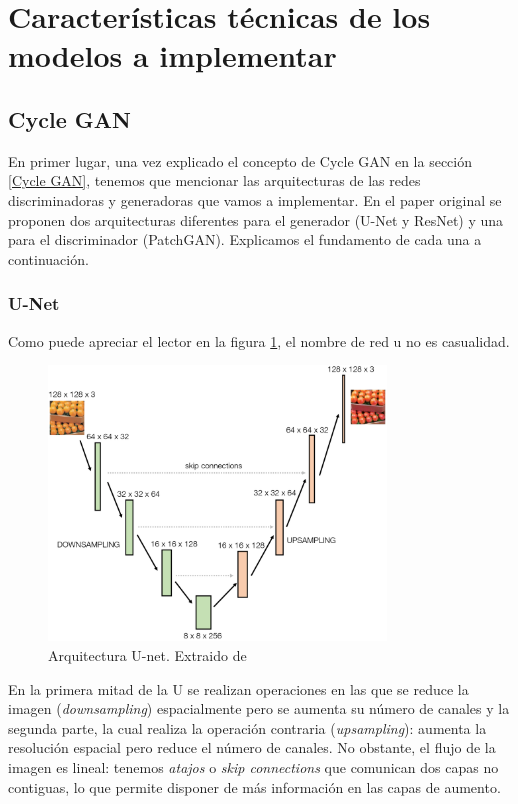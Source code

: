 \documentclass[../main.tex]{subfiles}
\begin{document}
\section{Características técnicas de los modelos a implementar}
\subsection{Cycle GAN}

En primer lugar, una vez explicado el concepto de Cycle GAN en la sección \ref{Cycle GAN}, tenemos que mencionar las arquitecturas de las redes discriminadoras y generadoras que vamos a implementar. En el paper original \cite{Zhu2017} se proponen dos arquitecturas diferentes para el generador (U-Net y ResNet) y una para el discriminador (PatchGAN). Explicamos el fundamento de cada una a continuación.

\subsubsection{U-Net}

Como puede apreciar el lector en la figura \ref{fig:unet}, el nombre de red u no es casualidad. 

\begin{figure}[h]
    \centering
    \includegraphics[width=0.8\textwidth]{imagenes/unet.png}
    \caption[Arquitectura U-net]{Arquitectura U-net. Extraido de \cite{Foster2019}}
    \label{fig:unet}
\end{figure}

En la primera mitad de la U se realizan operaciones en las que se reduce la imagen (\textit{downsampling})  espacialmente pero se aumenta su número de canales y la segunda parte, la cual realiza la operación contraria (\textit{upsampling}): aumenta la resolución espacial pero reduce el número de canales. No obstante, el flujo de la imagen es lineal: tenemos \textit{atajos} o \textit{skip connections} que comunican dos capas no contiguas, lo que permite disponer de más información en las capas de aumento. \newline
\end{document}
